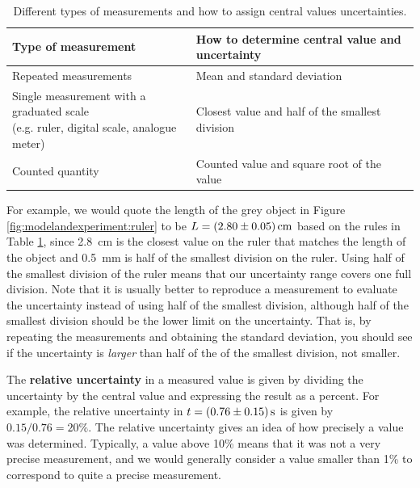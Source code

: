 \begin{table}[!h]
\centering
\begin{tabular}{ll}
\parbox[t]{7.62cm}{\textbf{Type of measurement}} & \parbox[t]{7.62cm}{\textbf{How to determine central value and uncertainty}} \\
\hline
\parbox[t]{7.62cm}{Repeated measurements} & \parbox[t]{7.62cm}{Mean and standard deviation} \\
\hline
\parbox[t]{7.62cm}{Single measurement with a graduated scale\\(e.g. ruler, digital scale, analogue meter)} & \parbox[t]{7.62cm}{Closest value and half of the smallest division} \\
\hline
\parbox[t]{7.62cm}{Counted quantity} & \parbox[t]{7.62cm}{Counted value and square root of the value} \\
\hline
\end{tabular}
\caption{\label{tab:modelandexperiment:uncertainties} Different types of measurements and how to assign central values uncertainties.}
\end{table}
For example, we would quote the length of the grey object in Figure \ref{fig:modelandexperiment:ruler} to be $L=\SI{2.8\pm0.05}{cm}$ based on the rules in Table \ref{tab:modelandexperiment:uncertainties}, since \SI{2.8}{cm} is the closest value on the ruler that matches the length of the object and \SI{0.5}{mm} is half of the smallest division on the ruler. Using half of the smallest division of the ruler means that our uncertainty range covers one full division. Note that it is usually better to reproduce a measurement to evaluate the uncertainty instead of using half of the smallest division, although half of the smallest division should be the lower limit on the uncertainty. That is, by repeating the measurements and obtaining the standard deviation, you should see if the uncertainty is \textit{larger} than half of the of the smallest division, not smaller.

The \textbf{relative uncertainty} in a measured value is given by dividing the uncertainty by the central value and expressing the result as a percent. For example, the relative uncertainty in $t=\SI{0.76\pm 0.15}{s}$ is given by $0.15/0.76=20\%$. The relative uncertainty gives an idea of how precisely a value was determined. Typically, a value above 10\% means that it was not a very precise measurement, and we would generally consider a value smaller than 1\% to correspond to quite a precise measurement. 

